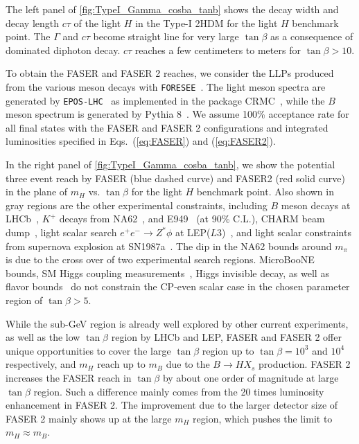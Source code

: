 \documentclass[letterpaper,11pt]{article}
\newcommand{\tanb}{\tan \beta}
\begin{document}
The left panel of \autoref{fig:TypeI_Gamma_cosba_tanb} shows the decay width and  decay length $c\tau$ of the light $H$ in the Type-I 2HDM for the light $H$ benchmark point.  The $\Gamma$ and $c\tau$ become straight line for very large $\tan\beta$ as a consequence of dominated diphoton decay. $c\tau$ reaches a few centimeters to meters for $\tanb > 10$.  

To obtain the FASER and FASER 2  reaches, we consider the LLPs produced from the various meson decays with {\tt FORESEE}~\cite{Kling:2021fwx}. The light meson spectra are generated by {\tt EPOS-LHC}~\cite{Pierog:2013ria} as implemented in the package CRMC~\cite{crmc}, while the $B$ meson spectrum is generated by Pythia 8~\cite{Sjostrand:2007gs}. We assume 100\% acceptance rate for all final states with the FASER and FASER 2 configurations and integrated luminosities specified in Eqs.~(\ref{eq:FASER}) and (\ref{eq:FASER2}).
 
In the right panel of \autoref{fig:TypeI_Gamma_cosba_tanb}, we show the potential three event reach by FASER (blue dashed curve) and FASER2 (red solid curve) in the plane of  $m_H$ vs. $\tanb$ for the light $H$ benchmark point.   Also shown in gray regions  are the other   experimental constraints, including  $B$ meson decays at LHCb~\cite{LHCb:2015nkv}, $K^+$ decays from NA62~\cite{NA62:2021zjw},  and E949~\cite{BNL-E949:2009dza} (at 90\% C.L.), CHARM beam dump~\cite{CHARM:1985anb,Krnjaic:2015mbs}, light scalar search $e^+e^- \to Z^* \phi$ at LEP($L3$)~\cite{L3:1996ome,Winkler:2018qyg}, and light scalar constraints from supernova explosion at SN1987a~\cite{Turner:1987by,Ellis:1987pk,Krnjaic:2015mbs}.
The dip in the NA62 bounds around $m_\pi$ is  due to the cross over of two experimental search regions. 
MicroBooNE~\cite{MicroBooNE:2021usw} bounds, SM Higgs coupling measurements~\cite{Han:2020lta}, Higgs invisible decay, as well as flavor bounds~\cite{Haller:2018nnx} do not constrain the CP-even scalar case in the chosen parameter region of $\tan\beta>5$.  
 
While the sub-GeV region is already well explored by other current experiments, as well as the low $\tanb$ region by LHCb and LEP, FASER and FASER 2 offer unique opportunities to cover the large $\tan\beta$ region up to $\tanb=10^3$ and $10^4$ respectively, and $m_H$ reach up to $m_B$ due to the $B\to H X_s$ production.  FASER 2 increases the FASER reach in $\tan\beta$ by about one order of magnitude at large $\tanb$ region. Such a difference mainly comes from the 20 times luminosity enhancement in FASER 2.     The improvement due to the  larger detector size of FASER 2  mainly shows up at the large $m_H$ region, which pushes the limit to $m_H\approx m_B$.  
\end{document}
